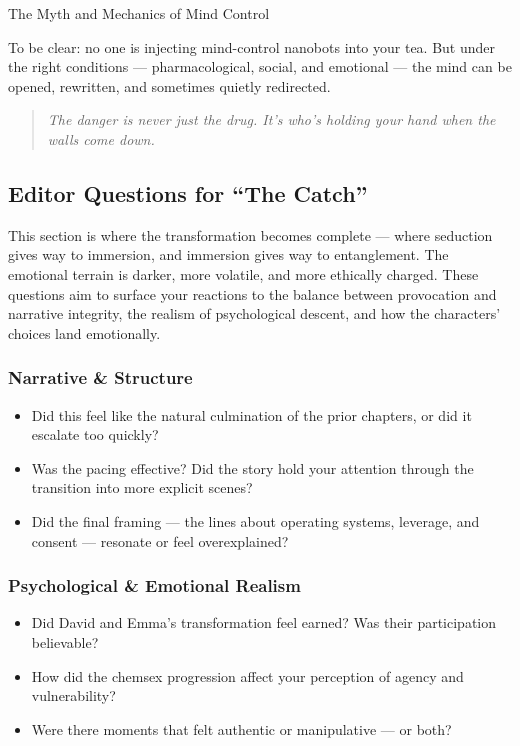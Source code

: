 \begin{PsychologicalSidebar}{The Myth and Mechanics of Mind Control}
  \medskip
  
  To be clear: no one is injecting mind-control nanobots into your tea. But under the right conditions — pharmacological, 
  social, and emotional — the mind can be opened, rewritten, and sometimes quietly redirected.
  
  \begin{quote}
  \textit{The danger is never just the drug. It’s who’s holding your hand when the walls come down.}
  \end{quote}
  
\end{PsychologicalSidebar}

\medskip

\subsection{Editor Questions for ``The Catch''}

This section is where the transformation becomes complete — where seduction gives way to immersion, and immersion gives way to entanglement. The emotional terrain is darker, more volatile, and more ethically charged. These questions aim to surface your reactions to the balance between provocation and narrative integrity, the realism of psychological descent, and how the characters’ choices land emotionally.

\subsubsection{Narrative \& Structure}

\begin{itemize}
  \item Did this feel like the natural culmination of the prior chapters, or did it escalate too quickly?
  \item Was the pacing effective? Did the story hold your attention through the transition into more explicit scenes?
  \item Did the final framing — the lines about operating systems, leverage, and consent — resonate or feel overexplained?
\end{itemize}

\subsubsection{Psychological \& Emotional Realism}

\begin{itemize}
  \item Did David and Emma’s transformation feel earned? Was their participation believable?
  \item How did the chemsex progression affect your perception of agency and vulnerability?
  \item Were there moments that felt authentic or manipulative — or both?
\end{itemize}

